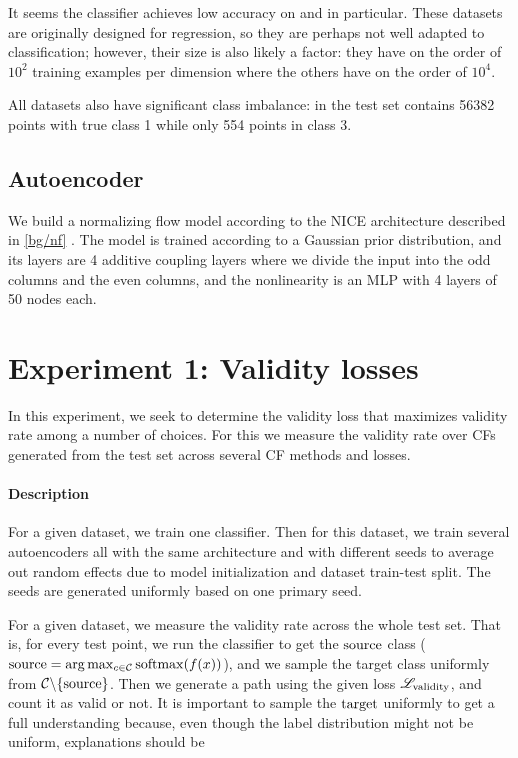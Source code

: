 \documentclass[../main.tex]{subfiles}
\begin{document}
It seems the classifier achieves low accuracy on \WineQuality{} and \OnlineNewsPopularity{} in particular.
These datasets are originally designed for regression, so they are perhaps not well adapted to classification; however, their size is also likely a factor: they have on the order of $10^2$ training examples per dimension where the others have on the order of $10^4$.

All datasets also have significant class imbalance: in \ForestCover{} the test set contains 56382 points with true class 1 while only 554 points in class 3.

\subsection{Autoencoder}

We build a normalizing flow model according to the NICE architecture described in \autoref{bg/nf} \cite{dinhNICE2015}.
The model is trained according to a Gaussian prior distribution, and its layers are 4 additive coupling layers where we divide the input into the odd columns and the even columns, and the nonlinearity is an MLP with 4 layers of 50 nodes each. 

\section{Experiment 1: Validity losses}

In this experiment, we seek to determine the validity loss that maximizes validity rate among a number of choices.
For this we measure the validity rate over CFs generated from the test set across several CF methods and losses.

\paragraph{Description}
\label{validity_losses/description}

For a given dataset, we train one classifier.
Then for this dataset, we train several autoencoders all with the same architecture and with different seeds to average out random effects due to model initialization and dataset train-test split.
The seeds are generated uniformly based on one primary seed.

For a given dataset, we measure the validity rate across the whole test set.
That is, for every test point, we run the classifier to get the $\mathrm{source}$ class ($\mathrm{source} = \arg\max_{c \in \mathcal{C}} \mathrm{softmax}( f(x) )$), and we sample the target class uniformly from $\mathcal{C} \backslash \{\mathrm{source}\}$.
Then we generate a path using the given loss $\mathscr{L}_\text{validity}$, and count it as valid or not.
It is important to sample the $\mathrm{target}$ uniformly to get a full understanding because, even though the label distribution might not be uniform, explanations should be
\end{document}
